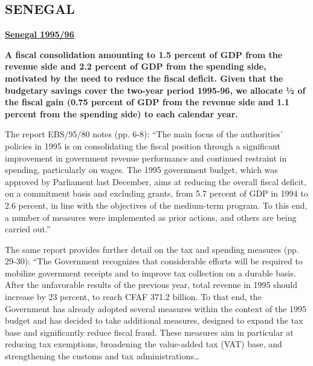 \subsection[SENEGAL]{SENEGAL\protect\footnotemark}

\textbf{\underline{Senegal 1995/96}}

\textbf{A fiscal consolidation amounting to 1.5 percent of GDP from the revenue side and 2.2 percent of GDP from the spending side, motivated by the need to reduce the fiscal deficit. Given that the budgetary savings cover the two-year period 1995-96, we allocate ½ of the fiscal gain (0.75 percent of GDP from the revenue side and 1.1 percent from the spending side) to each calendar year.}

The report EBS/95/80 notes (pp. 6-8): “The main focus of the authorities' policies in 1995 is on consolidating the fiscal position through a significant improvement in government revenue performance and continued restraint in spending, particularly on wages. The 1995 government budget, which was approved by Parliament last December, aims at reducing the overall fiscal deficit, on a commitment basis and excluding grants, from 5.7 percent of GDP in 1994 to 2.6 percent, in line with the objectives of the medium-term program. To this end, a number of measures were implemented as prior actions, and others are being carried out.”

The same report provides further detail on the tax and spending measures (pp. 29-30): “The Government recognizes that considerable efforts will be required to mobilize government receipts and to improve tax collection on a durable basis. After the unfavorable results of the previous year, total revenue in 1995 should increase by 23 percent, to reach CFAF 371.2 billion. To that end, the Government has already adopted several measures within the context of the 1995 budget and has decided to take additional measures, designed to expand the tax base and significantly reduce fiscal fraud. These measures aim in particular at reducing tax exemptions, broadening the value-added tax (VAT) base, and strengthening the customs and tax administrations…

